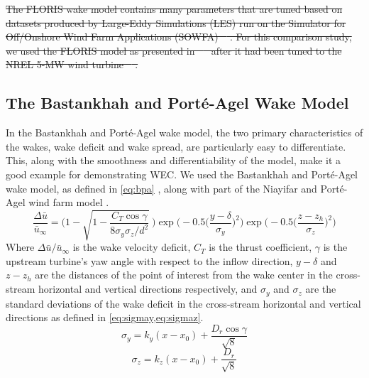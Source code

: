 \documentclass[a4paper]{jpconf}
\providecommand{\DIFdel}[1]{{\protect\color{red}\sout{#1}}}                      %
\providecommand{\DIFdelbegin}{} %
\providecommand{\DIFdelend}{} %
\newcommand{\DIFscaledelfig}{0.5}
\newlength{\DIFdelgraphicswidth} %
\newlength{\DIFdelgraphicsheight} %
\newcommand{\DIFdelincludegraphics}[2][]{%
\sbox{\DIFdelgraphicsbox}{\DIFOincludegraphics[#1]{#2}}%
\settoboxwidth{\DIFdelgraphicswidth}{\DIFdelgraphicsbox} %
\settoboxtotalheight{\DIFdelgraphicsheight}{\DIFdelgraphicsbox} %
\scalebox{\DIFscaledelfig}{%
\parbox[b]{\DIFdelgraphicswidth}{\usebox{\DIFdelgraphicsbox}\\[-\baselineskip] \rule{\DIFdelgraphicswidth}{0em}}\llap{\resizebox{\DIFdelgraphicswidth}{\DIFdelgraphicsheight}{%
\setlength{\unitlength}{\DIFdelgraphicswidth}%
\begin{picture}(1,1)%
\thicklines\linethickness{2pt} %
{\color[rgb]{1,0,0}\put(0,0){\framebox(1,1){}}}%
{\color[rgb]{1,0,0}\put(0,0){\line( 1,1){1}}}%
{\color[rgb]{1,0,0}\put(0,1){\line(1,-1){1}}}%
\end{picture}%
}\hspace*{3pt}}} %
} %
\DeclareRobustCommand{\DIFdelbegin}{\DIFOdelbegin \let\includegraphics\DIFdelincludegraphics} %
\DeclareRobustCommand{\DIFdelend}{\DIFOaddend \let\includegraphics\DIFOincludegraphics} %
\begin{document}
\DIFdelbegin \DIFdel{The FLORIS wake model contains many parameters that are tuned based on datasets produced by Large-Eddy Simulations (LES) run on the Simulator for Off/Onshore Wind Farm Applications (SOWFA) \mbox{%
\cite{fleming2015}}\hspace{0pt}%
. For this comparison study, we used the FLORIS model as presented in \mbox{%
\cite{thomas2016-improving-floris} }\hspace{0pt}%
after it had been tuned to the NREL 5-MW wind turbine \mbox{%
\cite{jonkman2009}}\hspace{0pt}%
.
}%

\DIFdelend \subsection{The Bastankhah and Port\'e-Agel Wake Model}
In the Bastankhah and Port\'e-Agel wake model, the two primary characteristics of the wakes, wake deficit and wake spread, are particularly easy to differentiate. This, along with the smoothness and differentiability of the model, make it a good example for demonstrating WEC. We used the Bastankhah and Port\'e-Agel wake model, as defined in \cref{eq:bpa} \cite{bastankhah2016}, along with part of the Niayifar and Port\'e-Agel wind farm model \cite{niayifar2016}.
%
\begin{equation}
	\frac{\Delta \bar{u}}{\bar{u}_{\infty}} = \Bigg(1-\sqrt{1-\frac{C_T \cos{\gamma}}{8 \sigma_y \sigma_z/d^2}}~\Bigg) \exp{\bigg(-0.5\Big(\frac{y-\delta}{\sigma_y}\Big)^2\bigg)}\exp{\bigg(-0.5\Big(\frac{z-z_h}{\sigma_z}\Big)^2\bigg)}
	 \label{eq:bpa}
\end{equation}
%
Where $\Delta \bar{u} / \bar{u}_{\infty}$ is the wake velocity deficit, $C_T$ is the thrust coefficient, $\gamma$ is the upstream turbine's yaw angle with respect to the inflow direction, $y-\delta$ and $z-z_h$ are the distances of the point of interest from the wake center in the cross-stream horizontal and vertical directions respectively, and $\sigma_y$ and $\sigma_z$ are the standard deviations of the wake deficit in the cross-stream horizontal and vertical directions as defined in \cref{eq:sigmay,eq:sigmaz}.
%
\begin{equation}\label{eq:sigmay}
	\sigma_y = k_y (x - x_0) + \frac{D_r \cos{\gamma}}{\sqrt{8}}
\end{equation}
%
\begin{equation}\label{eq:sigmaz}
	\sigma_z = k_z (x - x_0) + \frac{D_r}{\sqrt{8}}
\end{equation}
\end{document}
